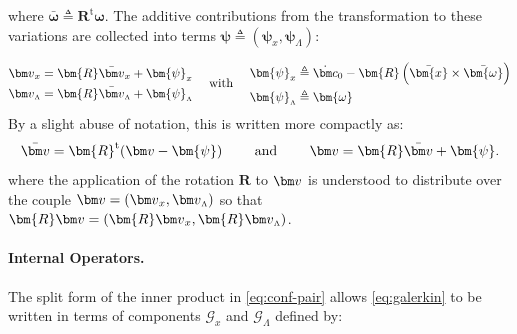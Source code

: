 where
\(\bar{\bm{\omega}} \triangleq \bm{R}^{\mathrm{t}}\bm{\omega}\). The
additive contributions from the transformation to these variations are
collected into terms
\(\bm{\psi} \triangleq (\bm{\psi}_x, \bm{\psi}_{\scriptscriptstyle{\Lambda}})\):

\begin{equation}
\begin{aligned}
\VarConfig_x &= \bm{R}\bar{\VarConfig}_x + \bm{\psi}_x \\
\VarConfig_{\scriptscriptstyle{\Lambda}} &= \bm{R}\bar{\VarConfig}_{\scriptscriptstyle{\Lambda}} +  \bm{\psi}_{\scriptscriptstyle{\Lambda}} \\
\end{aligned}
\quad\text{ with }\quad
\begin{aligned}
\bm{\psi}_x &\triangleq  \VarRigidTran - \bm{R}\left(\bar{\bm{x}} \times \bar{\bm{\omega}}\right) \\
\bm{\psi}_{\scriptscriptstyle{\Lambda}} &\triangleq  \bm{\omega} \\
\end{aligned}
\label{eq:psi}
\end{equation} 
By a slight abuse of notation, this is written more compactly as:
%
\begin{equation}
\bar{\VarConfig} = \bm{R}^{\mathrm{t}}(\VarConfig - \bm{\psi})
\qquad\text{ and }\qquad
\VarConfig = \bm{R}\bar{\VarConfig} + \bm{\psi} .
\label{eq:global-local}
\end{equation}
where the application of the
rotation \(\bm{R}\) to \(\VarConfig\) is understood to distribute over the
couple \(\VarConfig = (\VarConfig_x , \VarConfig_{\scriptscriptstyle{\Lambda}})\) so
that
\(\bm{R}\VarConfig = (\bm{R}\VarConfig_x , \bm{R}\VarConfig_{\scriptscriptstyle{\Lambda}})\).


\hypertarget{internal-operators-1}{%
\paragraph{Internal Operators.}\label{internal-operators-1}}

The split form of the inner product in \eqref{eq:conf-pair} allows
\eqref{eq:galerkin} to be written in terms of components
\(\mathcal{G}_x\) and \(\mathcal{G}_{\scriptscriptstyle{\Lambda}}\)
defined by:

